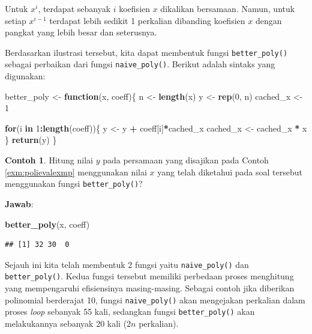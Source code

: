 \documentclass[
]{book}
\newenvironment{Shaded}{\begin{snugshade}}{\end{snugshade}}
\newcommand{\ControlFlowTok}[1]{\textcolor[rgb]{0.13,0.29,0.53}{\textbf{#1}}}
\newcommand{\DecValTok}[1]{\textcolor[rgb]{0.00,0.00,0.81}{#1}}
\newcommand{\FunctionTok}[1]{\textcolor[rgb]{0.13,0.29,0.53}{\textbf{#1}}}
\newcommand{\NormalTok}[1]{#1}
\newcommand{\OtherTok}[1]{\textcolor[rgb]{0.56,0.35,0.01}{#1}}
\newcommand{\SpecialCharTok}[1]{\textcolor[rgb]{0.81,0.36,0.00}{\textbf{#1}}}
\theoremstyle{definition}
\theoremstyle{definition}
\newtheorem{example}{Contoh}[chapter]
\theoremstyle{definition}
\theoremstyle{definition}
\theoremstyle{remark}
\begin{document}
Untuk \(x^i\), terdapat sebanyak \(i\) koefisien \(x\) dikalikan bersamaan. Namun, untuk setiap \(x^{i-1}\) terdapat lebih sedikit 1 perkalian dibanding koefisien \(x\) dengan pangkat yang lebih besar dan seterusnya.

Berdasarkan ilustrasi tersebut, kita dapat membentuk fungsi \texttt{better\_poly()} sebagai perbaikan dari fungsi \texttt{naive\_poly()}. Berikut adalah sintaks yang digunakan:

\begin{Shaded}
\begin{Highlighting}[]
\NormalTok{better\_poly }\OtherTok{\textless{}{-}} \ControlFlowTok{function}\NormalTok{(x, coeff)\{}
\NormalTok{  n }\OtherTok{\textless{}{-}} \FunctionTok{length}\NormalTok{(x)}
\NormalTok{  y }\OtherTok{\textless{}{-}} \FunctionTok{rep}\NormalTok{(}\DecValTok{0}\NormalTok{, n)}
\NormalTok{  cached\_x }\OtherTok{\textless{}{-}} \DecValTok{1}
  
  \ControlFlowTok{for}\NormalTok{(i }\ControlFlowTok{in} \DecValTok{1}\SpecialCharTok{:}\FunctionTok{length}\NormalTok{(coeff))\{}
\NormalTok{    y }\OtherTok{\textless{}{-}}\NormalTok{ y }\SpecialCharTok{+}\NormalTok{ coeff[i]}\SpecialCharTok{*}\NormalTok{cached\_x}
\NormalTok{    cached\_x }\OtherTok{\textless{}{-}}\NormalTok{ cached\_x }\SpecialCharTok{*}\NormalTok{ x}
\NormalTok{  \}}
  \FunctionTok{return}\NormalTok{(y)}
\NormalTok{\}}
\end{Highlighting}
\end{Shaded}

\begin{example}
\protect\hypertarget{exm:polievalexmp2}{}\label{exm:polievalexmp2}Hitung nilai \(y\) pada persamaan yang disajikan pada Contoh \ref{exm:polievalexmp} menggunakan nilai \(x\) yang telah diketahui pada soal tersebut menggunakan fungsi \texttt{better\_poly()}?
\end{example}

\textbf{Jawab}:

\begin{Shaded}
\begin{Highlighting}[]
\FunctionTok{better\_poly}\NormalTok{(x, coeff)}
\end{Highlighting}
\end{Shaded}

\begin{verbatim}
## [1] 32 30  0
\end{verbatim}

Sejauh ini kita telah membentuk 2 fungsi yaitu \texttt{naive\_poly()} dan \texttt{better\_poly()}. Kedua fungsi tersebut memiliki perbedaan proses menghitung yang mempengaruhi efisiensinya masing-masing. Sebagai contoh jika diberikan polinomial berderajat 10, fungsi \texttt{naive\_poly()} akan mengejakan perkalian dalam proses \emph{loop} sebanyak 55 kali, sedangkan fungsi \texttt{better\_poly()} akan melakukannya sebanyak 20 kali (\(2n\) perkalian).
\end{document}
